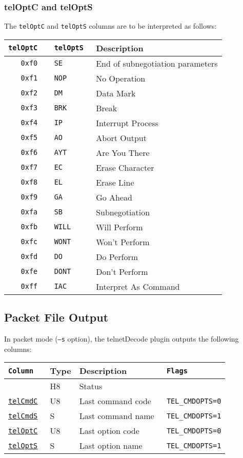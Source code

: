 \documentclass[documentation]{subfiles}
\begin{document}
\subsubsection{telOptC and telOptS}\label{telOpt}
The {\tt telOptC} and {\tt telOptS} columns are to be interpreted as follows:\\
\begin{longtable}{>{\tt}r>{\tt}ll}
    \toprule
    {\bf telOptC} & {\bf telOptS} & {\bf Description} \\
    \midrule\endhead%
    0xf0 & SE   & End of subnegotiation parameters\\
    0xf1 & NOP  & No Operation\\
    0xf2 & DM   & Data Mark\\
    0xf3 & BRK  & Break\\
    0xf4 & IP   & Interrupt Process\\
    0xf5 & AO   & Abort Output\\
    0xf6 & AYT  & Are You There\\
    0xf7 & EC   & Erase Character\\
    0xf8 & EL   & Erase Line\\
    0xf9 & GA   & Go Ahead\\
    0xfa & SB   & Subnegotiation\\
    0xfb & WILL & Will Perform\\
    0xfc & WONT & Won't Perform\\
    0xfd & DO   & Do Perform\\
    0xfe & DONT & Don't Perform\\
    0xff & IAC  & Interpret As Command\\
    \bottomrule
\end{longtable}

\subsection{Packet File Output}
In packet mode ({\tt --s} option), the telnetDecode plugin outputs the following columns:
\begin{longtable}{>{\tt}lll>{\tt\small}l}
    \toprule
    {\bf Column} & {\bf Type} & {\bf Description} & {\bf Flags}\\
    \midrule\endhead%
    \nameref{telStat}          & H8 & Status            & \\
    \hyperref[telCmd]{telCmdC} & U8 & Last command code & TEL\_CMDOPTS=0\\
    \hyperref[telCmd]{telCmdS} & S  & Last command name & TEL\_CMDOPTS=1\\
    \hyperref[telOpt]{telOptC} & U8 & Last option code  & TEL\_CMDOPTS=0\\
    \hyperref[telOpt]{telOptS} & S  & Last option name  & TEL\_CMDOPTS=1\\
    \bottomrule
\end{longtable}
\end{document}
